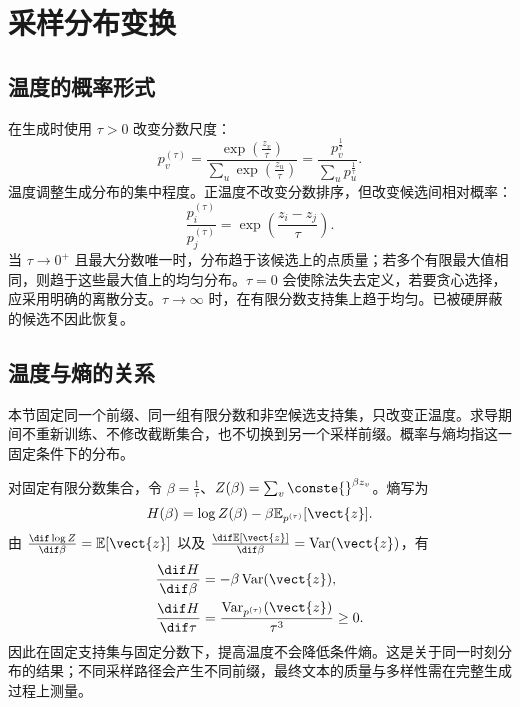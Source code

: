 \documentclass[../textbook.tex]{subfiles}
\begin{document}
\section{采样分布变换}

\subsection{温度的概率形式}
在生成时使用 $\tau>0$ 改变分数尺度：
\begin{equation}
 p^{(\tau)}_v=\frac{\exp(\frac{z_v}{\tau})}{\sum_u\exp(\frac{z_u}{\tau})}
 =\frac{p_v^{\frac{1}{\tau}}}{\sum_up_u^{\frac{1}{\tau}}}.\label{eq:ar-temperature}
\end{equation}
温度调整生成分布的集中程度。正温度不改变分数排序，但改变候选间相对概率：
\begin{equation}
 \frac{p^{(\tau)}_i}{p^{(\tau)}_j}
 =\exp\!\left(\frac{z_i-z_j}{\tau}\right).
\end{equation}
当 $\tau\to0^+$ 且最大分数唯一时，分布趋于该候选上的点质量；若多个有限最大值相同，则趋于这些最大值上的均匀分布。$\tau=0$ 会使除法失去定义，若要贪心选择，应采用明确的离散分支。$\tau\to\infty$ 时，在有限分数支持集上趋于均匀。已被硬屏蔽的候选不因此恢复。

\subsection{温度与熵的关系}
\begin{assumption}[温度单调性的适用条件]
本节固定同一个前缀、同一组有限分数和非空候选支持集，只改变正温度。求导期间不重新训练、不修改截断集合，也不切换到另一个采样前缀。概率与熵均指这一固定条件下的分布。
\end{assumption}
对固定有限分数集合，令 $\beta=\frac{1}{\tau}$、$Z(\beta)=\sum_v \conste{}^{\beta z_v}$。熵写为
\begin{equation}
 H(\beta)=\log Z(\beta)-\beta\mathbb E_{p^{(\tau)}}[\vect{z}].
\end{equation}
由 $\frac{\dif\log Z}{\dif\beta}=\mathbb E[\vect{z}]$ 以及
$\frac{\dif\mathbb E[\vect{z}]}{\dif\beta}=\operatorname{Var}(\vect{z})$，有
\begin{equation}
 \begin{aligned}
  \frac{\dif H}{\dif\beta}&=-\beta\operatorname{Var}(\vect{z}),\\
  \frac{\dif H}{\dif\tau}&=\frac{\operatorname{Var}_{p^{(\tau)}}(\vect{z})}{\tau^3}\geq0.
 \end{aligned}
\end{equation}
因此在固定支持集与固定分数下，提高温度不会降低条件熵。这是关于同一时刻分布的结果；不同采样路径会产生不同前缀，最终文本的质量与多样性需在完整生成过程上测量。
\end{document}
